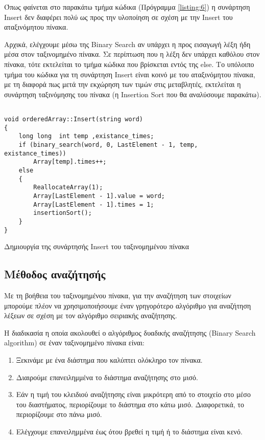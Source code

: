 Όπως φαίνεται στο παρακάτω τμήμα κώδικα (Πρόγραμμα \ref{listing:6}) η συνάρτηση \en Insert \gr δεν διαφέρει πολύ ως προς την υλοποίηση σε σχέση με την  \en Insert \gr του αταξινόμητου πίνακα.

Αρχικά, ελέγχουμε μέσω της \en Binary Search \gr αν υπάρχει η προς εισαγωγή λέξη ήδη μέσα στον ταξινομημένο πίνακα. Σε περίπτωση που η λέξη δεν υπάρχει καθόλου στον πίνακα, τότε εκτελείται το τμήμα κώδικα που βρίσκεται εντός της \en else\gr. Το υπόλοιπο τμήμα του κώδικα για τη συνάρτηση \en Insert \gr είναι κοινό με του αταξινόμητου πίνακα, με τη διαφορά πως μετά την εκχώρηση των τιμών στις μεταβλητές, εκτελείται η συνάρτηση ταξινόμησης του πίνακα (η \en Insertion Sort \gr που θα αναλύσουμε παρακάτω).

\en
\begin{listing}[ht]
\begin{verbatim}

void orderedArray::Insert(string word)
{
    long long  int temp ,existance_times;
    if (binary_search(word, 0, LastElement - 1, temp, existance_times))
        Array[temp].times++;
    else
    {
        ReallocateArray(1);
        Array[LastElement - 1].value = word;
        Array[LastElement - 1].times = 1;
        insertionSort();
    }
}

\end{verbatim}
\caption{Δημιουργία της συνάρτησής Insert του ταξινομημένου πίνακα}
\label{listing:6}
\end{listing}
\gr


\subsection{Μέθοδος αναζήτησής}

Με τη βοήθεια του ταξινομημένου πίνακα, για την αναζήτηση των στοιχείων μπορούμε πλέον να χρησιμοποιήσουμε έναν γρηγορότερο αλγόριθμο για αναζήτηση λέξεων σε σχέση με τον αλγόριθμο σειριακής αναζήτησης.

Η διαδικασία η οποία ακολουθεί ο αλγόριθμος δυαδικής αναζήτησης (\en Binary Search algorithm\gr) σε έναν ταξινομημένο πίνακα είναι:

\begin{enumerate}
    \item Ξεκινάμε με ένα διάστημα που καλύπτει ολόκληρο τον πίνακα.
    \item Διαιρούμε επανειλημμένα το διάστημα αναζήτησης στο μισό.
    \item Εάν η τιμή του κλειδιού αναζήτησης είναι μικρότερη από το στοιχείο στο μέσο του διαστήματος, περιορίζουμε το διάστημα στο κάτω μισό. Διαφορετικά, το περιορίζουμε στο πάνω μισό.
   \item Ελέγχουμε επανειλημμένα έως ότου βρεθεί η τιμή ή το διάστημα είναι κενό.
\end{enumerate}

